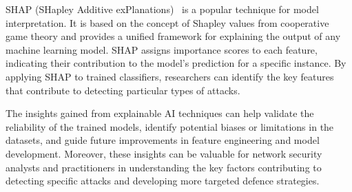 SHAP (SHapley Additive exPlanations)~\cite{lundberg2017unified} is a popular technique for model interpretation. It is based on the concept of Shapley values from cooperative game theory and provides a unified framework for explaining the output of any machine learning model. SHAP assigns importance scores to each feature, indicating their contribution to the model's prediction for a specific instance. By applying SHAP to trained classifiers, researchers can identify the key features that contribute to detecting particular types of attacks.

The insights gained from explainable AI techniques can help validate the reliability of the trained models, identify potential biases or limitations in the datasets, and guide future improvements in feature engineering and model development. Moreover, these insights can be valuable for network security analysts and practitioners in understanding the key factors contributing to detecting specific attacks and developing more targeted defence strategies.